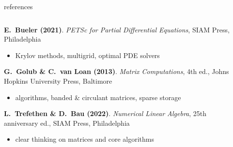 \documentclass[10pt,
               svgnames,
               hyperref={colorlinks,citecolor=DeepPink4,linkcolor=FireBrick,urlcolor=Maroon},
               usepdftitle=false]{beamer}
\begin{document}
\begin{frame}{references}

\begin{columns}
\begin{column}{0.8\textwidth}
\begin{itemize}
{\small
\item[] \textbf{E.~Bueler (2021)}. \emph{PETSc for Partial Differential Equations}, SIAM Press, Philadelphia
    \begin{itemize}
    \item[$\circ$] Krylov methods, multigrid, optimal PDE solvers
    \end{itemize}
\item[] \textbf{G.~Golub \& C.~van Loan (2013)}. \emph{Matrix Computations}, 4th ed., Johns Hopkins University Press, Baltimore
    \begin{itemize}
    \item[$\circ$] algorithms, banded \& circulant matrices, sparse storage
    \end{itemize}
\item[] \textbf{L.~Trefethen \& D.~Bau (2022)}. \emph{Numerical Linear Algebra}, 25th anniversary ed., SIAM Press, Philadelphia
    \begin{itemize}
    \item[$\circ$] clear thinking on matrices and core algorithms
    \end{itemize}
}
\end{itemize}
\end{column}
\begin{column}{0.17\textwidth}

\end{column}
\end{columns}
\end{frame}
\end{document}
